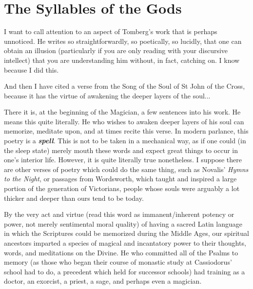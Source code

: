\section{The Syllables of the Gods}

I want to call attention to an aspect of Tomberg's work that is perhaps unnoticed. He writes so straightforwardly, so poetically, so lucidly, that one can obtain an illusion (particularly if you are only reading with your discursive intellect) that you are understanding him without, in fact, catching on. I know because I did this.

\begin{quotex}
And then I have cited a verse from the Song of the Soul of St John of the Cross, because it has the virtue of awakening the deeper layers of the soul...
\end{quotex}


There it is, at the beginning of the Magician, a few sentences into his work. He means this quite literally. He who wishes to awaken deeper layers of his soul can memorize, meditate upon, and at times recite this verse. In modern parlance, this poetry is a \textbf{\emph{spell}}. This is not to be taken in a mechanical way, as if one could (in the sleep state) merely mouth these words and expect great things to occur in one's interior life. However, it is quite literally true nonetheless. I suppose there are other verses of poetry which could do the same thing, such as Novalis' \emph{Hymns to the Night}, or passages from Wordsworth, which taught and inspired a large portion of the generation of Victorians, people whose souls were arguably a lot thicker and deeper than ours tend to be today.

By the very act and virtue (read this word as immanent/inherent potency or power, not merely sentimental moral quality) of having a sacred Latin language in which the Scriptures could be memorized during the Middle Ages, our spiritual ancestors imparted a species of magical and incantatory power to their thoughts, words, and meditations on the Divine. He who committed all of the Psalms to memory (as those who began their course of monastic study at Cassiodorus' school had to do, a precedent which held for successor schools) had training as a doctor, an exorcist, a priest, a sage, and perhaps even a magician.

